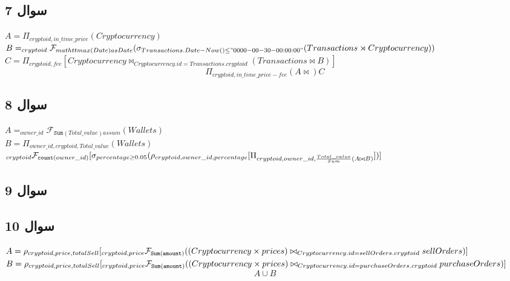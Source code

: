 \documentclass{book}
\begin{document}
        \subsection{سوال 7}

        \begin{latin}
            
            $A= \Pi_{cryptoid, in\_time\_price} (Cryptocurrency)$\\
            $B=_{cryptoid} \mathcal{F}_{mathtt{max}(Date) as Date} (\sigma_{Transactions.Date - Now() \leq "0000-00-30-00:00:00"}\\(Transactions \rtimes Cryptocurrency))$\\
            $C = \Pi_{cryptoid,fee} [Cryptocurrency \bowtie_{Cryptocurrency.id = Transactions.cryptoid} (Transactions \bowtie B)]$\\
            $$\Pi_{cryptoid, in\_time\_price - fee} (A \bowtie) C$$
        \end{latin}


        \subsection{سوال 8}

        \begin{latin}
            $A = _{owner\_id} \mathcal{F}_{\mathtt{Sum}(Total\_value) as sum} (Wallets)$\\
            $B = \Pi_{owner\_id, cryptoid, Total\_value} (Wallets)$\\
            $_{cryptoid}\mathcal{F}_{\mathtt{count}(owner\_id)} [\sigma_{percentage \geq 0.05} (\rho_{cryptoid, owner\_id, percentage}[\\\Pi_{cryptoid, owner\_id, \frac{Total\_value}{Sum}(A\bowtie B)}])]$
        \end{latin}


        \subsection{سوال 9}


        \subsection{سوال 10}
        $A = \rho_{cryptoid, price, totalSell} [_{cryptoid, price}\mathcal{F}_{\mathtt{Sum(amount)}}((Cryptocurrency \times prices) \\\bowtie_{Cryptocurrency.id = sellOrders.cryptoid} sellOrders)]$\\
        $B = \rho_{cryptoid, price, totalSell} [_{cryptoid, price}\mathcal{F}_{\mathtt{Sum(amount)}}((Cryptocurrency \times prices) \\\bowtie_{Cryptocurrency.id = purchaseOrders.cryptoid} purchaseOrders)]$\\
        $$A \cup B$$
\end{document}
